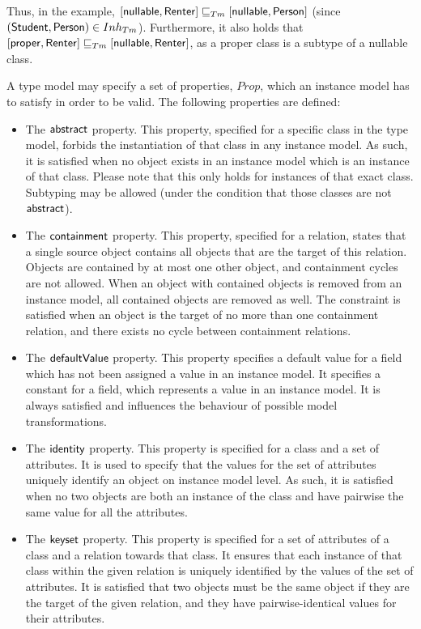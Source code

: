 Thus, in the example, $[ \mathsf{nullable}, \mathsf{Renter} ] \sqsubseteq_{Tm} [ \mathsf{nullable}, \mathsf{Person} ]$ (since $(\mathsf{Student}, \mathsf{Person}) \in Inh_{Tm}$). Furthermore, it also holds that $[ \mathsf{proper}, \mathsf{Renter} ] \sqsubseteq_{Tm} [ \mathsf{nullable}, \mathsf{Renter} ]$, as a proper class is a subtype of a nullable class.

A type model may specify a set of properties, $Prop$, which an instance model has to satisfy in order to be valid. The following properties are defined:
\begin{itemize}
\item The $\mathsf{abstract}$ property. This property, specified for a specific class in the type model, forbids the instantiation of that class in any instance model. As such, it is satisfied when no object exists in an instance model which is an instance of that class. Please note that this only holds for instances of that exact class. Subtyping may be allowed (under the condition that those classes are not $\mathsf{abstract}$).

\item The $\mathsf{containment}$ property. This property, specified for a relation, states that a single source object contains all objects that are the target of this relation. Objects are contained by at most one other object, and containment cycles are not allowed. When an object with contained objects is removed from an instance model, all contained objects are removed as well. The constraint is satisfied when an object is the target of no more than one containment relation, and there exists no cycle between containment relations.

\item The $\mathsf{defaultValue}$ property. This property specifies a default value for a field which has not been assigned a value in an instance model. It specifies a constant for a field, which represents a value in an instance model. It is always satisfied and influences the behaviour of possible model transformations.

\item The $\mathsf{identity}$ property. This property is specified for a class and a set of attributes. It is used to specify that the values for the set of attributes uniquely identify an object on instance model level. As such, it is satisfied when no two objects are both an instance of the class and have pairwise the same value for all the attributes.

\item The $\mathsf{keyset}$ property. This property is specified for a set of attributes of a class and a relation towards that class. It ensures that each instance of that class within the given relation is uniquely identified by the values of the set of attributes. It is satisfied that two objects must be the same object if they are the target of the given relation, and they have pairwise-identical values for their attributes.


\end{itemize}
